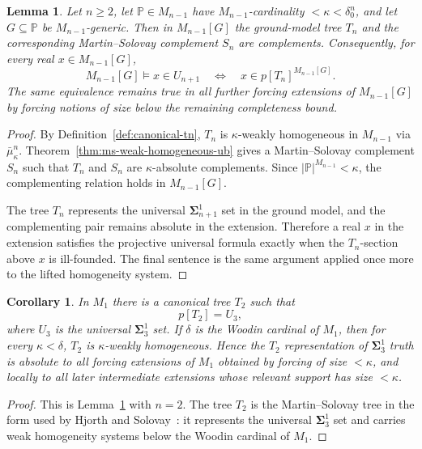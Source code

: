 \documentclass[a4paper,11pt]{article}
\newtheorem{lemma}[theorem]{Lemma}
\newtheorem{corollary}[theorem]{Corollary}
\begin{document}
\begin{lemma}\label{lem:tn-small-generic-absoluteness}
Let $n\geq 2$, let $\mathbb P\in M_{n-1}$ have $M_{n-1}$-cardinality $<\kappa<\delta^n_0$, and let $G\subseteq\mathbb P$ be $M_{n-1}$-generic.  Then in $M_{n-1}[G]$ the ground-model tree $T_n$ and the corresponding Martin--Solovay complement $S_n$ are complements.  Consequently, for every real $x\in M_{n-1}[G]$,
\[
   M_{n-1}[G]\models x\in U_{n+1}
   \quad\Longleftrightarrow\quad
   x\in p[T_n]^{M_{n-1}[G]} .
\]
The same equivalence remains true in all further forcing extensions of $M_{n-1}[G]$ by forcing notions of size below the remaining completeness bound.
\end{lemma}

\begin{proof}
By Definition~\ref{def:canonical-tn}, $T_n$ is $\kappa$-weakly homogeneous in $M_{n-1}$ via $\bar\mu^n_\kappa$.  Theorem~\ref{thm:ms-weak-homogeneous-ub} gives a Martin--Solovay complement $S_n$ such that $T_n$ and $S_n$ are $\kappa$-absolute complements.  Since $|\mathbb P|^{M_{n-1}}<\kappa$, the complementing relation holds in $M_{n-1}[G]$.

The tree $T_n$ represents the universal $\boldsymbol{\Sigma}^1_{n+1}$ set in the ground model, and the complementing pair remains absolute in the extension.  Therefore a real $x$ in the extension satisfies the projective universal formula exactly when the $T_n$-section above $x$ is ill-founded.  The final sentence is the same argument applied once more to the lifted homogeneity system.
\end{proof}

\begin{corollary}\label{cor:t2-sigma13-absoluteness}
In $M_1$ there is a canonical tree $T_2$ such that
\[
   p[T_2]=U_3,
\]
where $U_3$ is the universal $\boldsymbol{\Sigma}^1_3$ set.  If $\delta$ is the Woodin cardinal of $M_1$, then for every $\kappa<\delta$, $T_2$ is $\kappa$-weakly homogeneous.  Hence the $T_2$ representation of $\boldsymbol{\Sigma}^1_3$ truth is absolute to all forcing extensions of $M_1$ obtained by forcing of size $<\kappa$, and locally to all later intermediate extensions whose relevant support has size $<\kappa$.
\end{corollary}

\begin{proof}
This is Lemma~\ref{lem:tn-small-generic-absoluteness} with $n=2$.  The tree $T_2$ is the Martin--Solovay tree in the form used by Hjorth and Solovay~\cite{martin1969basis,Hjorth}: it represents the universal $\boldsymbol{\Sigma}^1_3$ set and carries weak homogeneity systems below the Woodin cardinal of $M_1$.
\end{proof}
\end{document}
